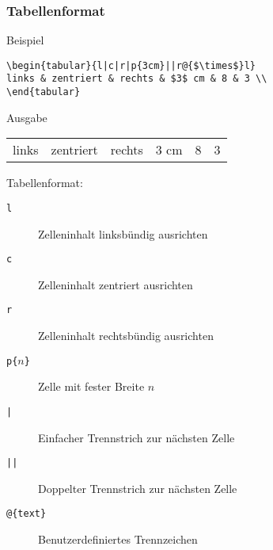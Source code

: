 \begin{frame}[c,fragile]
\frametitle{Tabellenformat}

\begin{block}{Beispiel}
\begin{verbatim}
\begin{tabular}{l|c|r|p{3cm}||r@{$\times$}l}
links & zentriert & rechts & $3$ cm & 8 & 3 \\
\end{tabular}
\end{verbatim}
\end{block}

\begin{block}{Ausgabe}
\begin{tabular}{l|c|r|p{3cm}||r@{$\times$}l}
links & zentriert & rechts & $3$ cm & 8 & 3 
\end{tabular}
\end{block}

Tabellenformat:
\begin{description}
\item[\texttt{l}] Zelleninhalt linksb\"undig ausrichten
\item[\texttt{c}] Zelleninhalt zentriert ausrichten
\item[\texttt{r}] Zelleninhalt rechtsb\"undig ausrichten
\item[\texttt{p\{$n$\}}] Zelle mit fester Breite $n$
\item[\texttt{|}] Einfacher Trennstrich zur n\"achsten Zelle
\item[\texttt{||}] Doppelter Trennstrich zur n\"achsten Zelle
\item[\texttt{@\{text\}}] Benutzerdefiniertes Trennzeichen
\end{description}

\end{frame}

